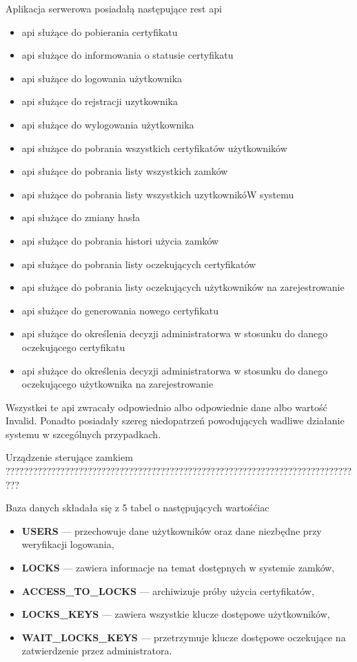     Aplikacja serwerowa posiadałą następujące rest api
    \begin{itemize}
    	\item api służące do pobierania certyfikatu
    	\item api służące do informowania o statusie certyfikatu
    	\item api służące do logowania użytkownika
    	\item api służące do rejstracji uzytkownika
    	\item api służące do wylogowania użytkownika
    	\item api służące do pobrania wszystkich certyfikatów użytkowników
    	\item api służące do pobrania listy wszystkich zamków
    	\item api służące do pobrania listy wszystkich uzytkownikóW systemu
    	\item api służące do zmiany hasła
    	\item api służące do pobrania histori użycia zamków
    	\item api służące do pobrania listy oczekujących certyfikatów
    	\item api służące do pobrania listy oczekujących użytkowników na zarejestrowanie
    	\item api służące do generowania nowego certyfikatu
    	\item api służące do określenia decyzji administratorwa w stosunku do danego oczekującego certyfikatu
    	\item api służące do określenia decyzji administratorwa w stosunku do danego oczekującego użytkownika na zarejestrowanie 
    \end{itemize}   
	Wszystkei te api zwracały odpowiednio albo odpowiednie dane albo wartość Invalid. Ponadto posiadały szereg niedopatrzeń powodujących wadliwe działanie systemu w szcególnych przypadkach. 
	
	Urządzenie sterujące zamkiem
	???????????????????????????????????????????????????????????????????????????????
	
Baza danych składała się z 5 tabel o następujących wartośćiac
	
	\begin{itemize}
		\item \textbf{USERS} --- przechowuje dane użytkowników oraz dane niezbędne przy weryfikacji logowania,
		\item \textbf{LOCKS} --- zawiera informacje na temat dostępnych w systemie zamków,
		\item \textbf{ACCESS\_TO\_LOCKS} --- archiwizuje próby użycia certyfikatów,
		\item \textbf{LOCKS\_KEYS} --- zawiera wszystkie klucze dostępowe użytkowników,
		\item \textbf{WAIT\_LOCKS\_KEYS} --- przetrzymuje klucze dostępowe oczekujące na zatwierdzenie przez administratora.
	\end{itemize}
	

